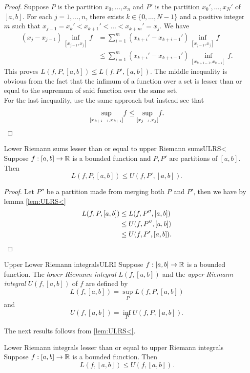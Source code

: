 \documentclass[twoside, openright, fontsize=10pt, headings=big]{scrbook}
\begin{document}
\begin{proof}
    Suppose $P$ is the partition $x_0,\dots,x_n$ and $P'$ is the partition $x_0',\dots,x_N'$ of $[a,b]$. For each $j=1,\dots,n$, there exists $k\in\{0,\dots,N-1\}$ and a positive integer $m$ such that $x_{j-1}=x_k'<x_{k+1}'<\dots<x_{k+m}'=x_j$. We have
    \begin{align*}
        (x_j-x_{j-1})\underset{[x_{j-1},x_j]}{\inf}f&=\sum_{i=1}^{m}(x_{k+i}'-x_{k+i-1}')\underset{[x_{j-1},x_j]}{\inf}f\\
        &\leq\sum_{i=1}^{m}(x_{k+i}'-x_{k+i-1}')\underset{[x_{k+i-1},x_{k+i}]}{\inf}f.
    \end{align*}
    This proves $L(f,P,[a,b])\leq L(f,P',[a,b])$. The middle inequality is obvious from the fact that the infimum of a function over a set is lesser than or equal to the supremum of said function over the same set.\\
    For the last inequality, use the same approach but instead see that 
    \[
        \underset{[x_{k+i-1},x_{k+i}]}{\sup}f\leq\underset{[x_{j-1},x_j]}{\sup}f.\qedhere
    \]
\end{proof}
\begin{lemma}{Lower Riemann sums lesser than or equal to upper Riemann sums}{ULRS<}
    Suppose $f : [a, b] \to \mathbb{R}$ is a bounded function and $P, P'$ are partitions of $[a, b]$. Then
    \[
        L(f,P,[a,b])\leq U(f,P',[a,b]).
    \]
\end{lemma}
\begin{proof}
    Let $P''$ be a partition made from merging both $P$ and $P'$, then we have by lemma \ref{lem:ULRS<}
    \begin{align*}
        L(f,P,[a,b])&\leq L(f,P'',[a,b])\\
        &\leq U(f,P'',[a,b])\\
        &\leq U(f,P',[a,b]).\qedhere
    \end{align*}
\end{proof}
\begin{definition}{Upper Lower Riemann integrals}{ULRI}
    Suppose $f : [a, b] \to \mathbb{R}$ is a bounded function. The \textit{lower Riemann integral} $L( f , [a, b])$ and the \textit{upper Riemann integral} $U( f , [a, b])$ of $f$ are defined by
    \[
        L( f , [a, b]) = \underset{P}{\sup} L( f , P, [a, b])
    \]
    and
    \[
        U( f , [a, b]) = \underset{P}{\inf} U( f , P, [a, b]).
    \]
\end{definition}
The next results follows from \ref{lem:ULRS<}.
\begin{lemma}{Lower Riemann integrals lesser than or equal to upper Riemann integrals}{}
    Suppose $f : [a, b] \to \mathbb{R}$ is a bounded function. Then
    \[
        L(f,[a,b])\leq U(f,[a,b]).
    \]
\end{lemma}
\end{document}
